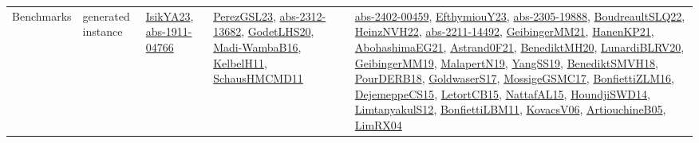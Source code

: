 {\begin{longtable}{lp{3cm}>{\raggedright}p{6cm}>{\raggedright}p{6cm}p{8cm}}
Benchmarks & generated instance & \href{articles/IsikYA23.pdf}{IsikYA23}\cite{IsikYA23}, \href{articles/abs-1911-04766.pdf}{abs-1911-04766}\cite{abs-1911-04766} & \href{papers/PerezGSL23.pdf}{PerezGSL23}\cite{PerezGSL23}, \href{articles/abs-2312-13682.pdf}{abs-2312-13682}\cite{abs-2312-13682}, \href{papers/GodetLHS20.pdf}{GodetLHS20}\cite{GodetLHS20}, \href{papers/Madi-WambaB16.pdf}{Madi-WambaB16}\cite{Madi-WambaB16}, \href{articles/KelbelH11.pdf}{KelbelH11}\cite{KelbelH11}, \href{articles/SchausHMCMD11.pdf}{SchausHMCMD11}\cite{SchausHMCMD11} & \href{articles/abs-2402-00459.pdf}{abs-2402-00459}\cite{abs-2402-00459}, \href{papers/EfthymiouY23.pdf}{EfthymiouY23}\cite{EfthymiouY23}, \href{articles/abs-2305-19888.pdf}{abs-2305-19888}\cite{abs-2305-19888}, \href{papers/BoudreaultSLQ22.pdf}{BoudreaultSLQ22}\cite{BoudreaultSLQ22}, \href{articles/HeinzNVH22.pdf}{HeinzNVH22}\cite{HeinzNVH22}, \href{articles/abs-2211-14492.pdf}{abs-2211-14492}\cite{abs-2211-14492}, \href{papers/GeibingerMM21.pdf}{GeibingerMM21}\cite{GeibingerMM21}, \href{papers/HanenKP21.pdf}{HanenKP21}\cite{HanenKP21}, \href{articles/AbohashimaEG21.pdf}{AbohashimaEG21}\cite{AbohashimaEG21}, \href{papers/Astrand0F21.pdf}{Astrand0F21}\cite{Astrand0F21}, \href{articles/BenediktMH20.pdf}{BenediktMH20}\cite{BenediktMH20}, \href{articles/LunardiBLRV20.pdf}{LunardiBLRV20}\cite{LunardiBLRV20}, \href{papers/GeibingerMM19.pdf}{GeibingerMM19}\cite{GeibingerMM19}, \href{papers/MalapertN19.pdf}{MalapertN19}\cite{MalapertN19}, \href{papers/YangSS19.pdf}{YangSS19}\cite{YangSS19}, \href{papers/BenediktSMVH18.pdf}{BenediktSMVH18}\cite{BenediktSMVH18}, \href{articles/PourDERB18.pdf}{PourDERB18}\cite{PourDERB18}, \href{papers/GoldwaserS17.pdf}{GoldwaserS17}\cite{GoldwaserS17}, \href{papers/MossigeGSMC17.pdf}{MossigeGSMC17}\cite{MossigeGSMC17}, \href{papers/BonfiettiZLM16.pdf}{BonfiettiZLM16}\cite{BonfiettiZLM16}, \href{papers/DejemeppeCS15.pdf}{DejemeppeCS15}\cite{DejemeppeCS15}, \href{articles/LetortCB15.pdf}{LetortCB15}\cite{LetortCB15}, \href{articles/NattafAL15.pdf}{NattafAL15}\cite{NattafAL15}, \href{papers/HoundjiSWD14.pdf}{HoundjiSWD14}\cite{HoundjiSWD14}, \href{articles/LimtanyakulS12.pdf}{LimtanyakulS12}\cite{LimtanyakulS12}, \href{papers/BonfiettiLBM11.pdf}{BonfiettiLBM11}\cite{BonfiettiLBM11}, \href{papers/KovacsV06.pdf}{KovacsV06}\cite{KovacsV06}, \href{papers/ArtiouchineB05.pdf}{ArtiouchineB05}\cite{ArtiouchineB05}, \href{papers/LimRX04.pdf}{LimRX04}\cite{LimRX04}\\

\end{longtable}}
